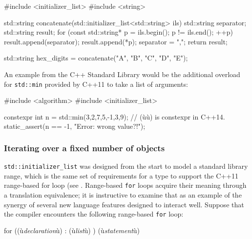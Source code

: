 \begin{emcppslisting}
#include <initializer_list>
#include <string>

std::string concatenate(std::initializer_list<std::string> ils)
{
    std::string separator;
    std::string result;
    for (const std::string* p = ils.begin(); p != ils.end(); ++p)
    {
        result.append(separator);
        result.append(*p);
        separator = ",";
    }
    return result;
}

std::string hex_digits = concatenate({"A", "B", "C", "D", "E"});
\end{emcppslisting}
    

\noindent An example from the C++ Standard Library would be the additional
overload for \lstinline!std::min! provided by C++11 to take a list of
arguments:

\begin{emcppslisting}
#include <algorithm>
#include <initializer_list>

constexpr int n = std::min({3,2,7,5,-1,3,9});  // (ù{}ù) is constexpr in C++14.
static_assert(n == -1, "Error: wrong value?!");
\end{emcppslisting}
    

\subsubsection[Iterating over a fixed number of objects]{Iterating over a fixed number of objects}\label{iterating-over-a-fixed-number-of-objects}

\lstinline!std::initializer_list! was designed from the start to model a
standard library range, which is the same set of requirements for a type
to support the C++11 range-based for loop (see .
Range-based \lstinline!for! loops acquire their meaning through a
translation equivalence; it is instructive to examine that as an example
of the synergy of several new language features designed to interact
well. Suppose that the compiler encounters the following range-based
\lstinline!for! loop:

\begin{emcppslisting}
for ((ù{\emph{declaration}}ù) : { (ù{\emph{list}}ù) }) (ù{\emph{statement}}ù)
\end{emcppslisting}
    


